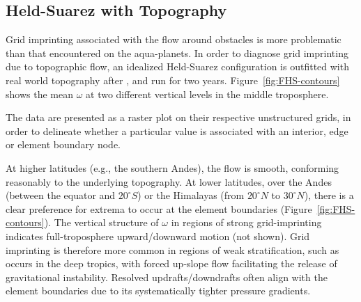 \documentclass{ametsoc}
\begin{document}
\subsection{Held-Suarez with Topography}

Grid imprinting associated with the flow around obstacles is more problematic than that encountered on the aqua-planets. In order to diagnose grid imprinting due to topographic flow, an idealized Held-Suarez configuration \citep{HS1994} is outfitted with real world topography after \cite{FRETAL2000WMR,BETAL2006MWR}, and run for two years. Figure~\ref{fig:FHS-contours} shows the mean $\omega$ at two different vertical levels in the middle troposphere. {The data are presented as a raster plot on their respective unstructured grids, in order to delineate whether a particular value is associated with an interior, edge or element boundary node. 

At higher latitudes (e.g., the southern Andes), the flow is smooth, conforming reasonably to the underlying topography. At lower latitudes, over the Andes (between the equator and $20^{\circ}S$) or the Himalayas (from $20^{\circ}N$ to $30^{\circ}N$), there is a clear preference for extrema to occur at the element boundaries (Figure~\ref{fig:FHS-contours}). The vertical structure of $\omega$ in regions of strong grid-imprinting indicates full-troposphere upward/downward motion (not shown). Grid imprinting is therefore more common in regions of weak stratification, such as occurs in the deep tropics, with forced up-slope flow facilitating the release of gravitational instability. Resolved updrafts/downdrafts often align with the element boundaries due to its systematically tighter pressure gradients. 

}
\end{document}
